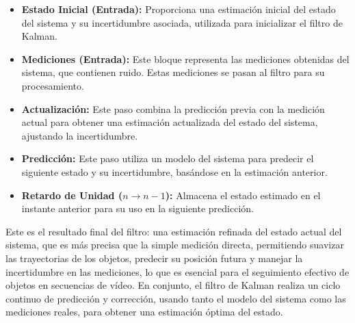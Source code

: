\documentclass[11pt,spanish,listoffigures,listoftables]{tfgetsinf}
\begin{document}
\begin{itemize}
   \item \textbf {Estado Inicial (Entrada):} Proporciona una estimación inicial del estado del sistema y su incertidumbre asociada, utilizada para inicializar el filtro de Kalman.

   \item \textbf{Mediciones (Entrada):} Este bloque representa las mediciones obtenidas del sistema, que contienen ruido. Estas mediciones se pasan al filtro para su procesamiento.

   \item \textbf{Actualización:} Este paso combina la predicción previa con la medición actual para obtener una estimación actualizada del estado del sistema, ajustando la incertidumbre.

   \item \textbf{Predicción:} Este paso utiliza un modelo del sistema para predecir el siguiente estado y su incertidumbre, basándose en la estimación anterior.
   \item \textbf{Retardo de Unidad (\(n \rightarrow n-1\)):} Almacena el estado estimado en el instante anterior para su uso en la siguiente predicción.
\end{itemize}

Este es el resultado final del filtro: una estimación refinada del estado actual del sistema, que es más precisa que la simple medición directa, permitiendo suavizar las trayectorias de los objetos, predecir su posición futura y manejar la incertidumbre en las mediciones, lo que es esencial para el seguimiento efectivo de objetos en secuencias de vídeo. En conjunto, el filtro de Kalman realiza un ciclo continuo de predicción y corrección, usando tanto el modelo del sistema como las mediciones reales, para obtener una estimación óptima del estado.
\end{document}
